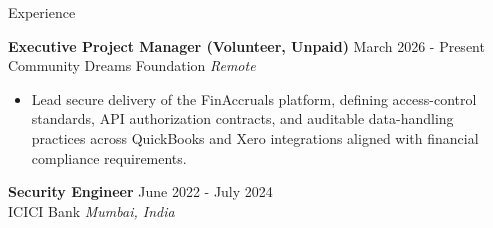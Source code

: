 \documentclass{resume}
\begin{document}
\begin{rSection}{Experience}

\textbf{Executive Project Manager (Volunteer, Unpaid)} \hfill March 2026 - Present\\
Community Dreams Foundation \hfill \textit{Remote}

\begin{itemize}
\vspace{-2mm}
  \item Lead secure delivery of the FinAccruals platform, defining access-control standards, API authorization contracts, and auditable data-handling practices across QuickBooks and Xero integrations aligned with financial compliance requirements.
\end{itemize}

\textbf{Security Engineer} \hfill June 2022 - July 2024\\
ICICI Bank \hfill \textit{Mumbai, India}


\end{rSection}
\end{document}
